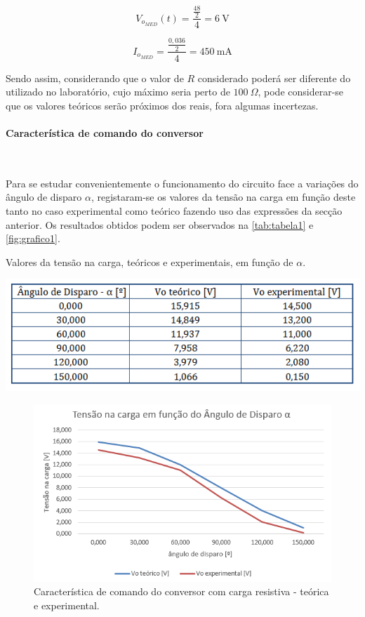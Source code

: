 \documentclass[a4paper,11pt]{article}
\numberwithin{equation}{section}
\begin{document}
\[V_{o_{MED}} (t) = \frac{\frac{48}{2}}{4} = 6~\text{V}\]

\[I_{o_{MED}}= \frac{\frac{0,036}{2}}{4} = 450~\text{mA}\]

\vspace{3mm}

Sendo assim, considerando que o valor de $R$ considerado poderá ser diferente do utilizado no laboratório, cujo máximo seria perto de $100~\Omega$, pode considerar-se que os valores teóricos serão próximos dos reais, fora algumas incertezas.

\paragraph{Característica de comando do conversor}\mbox{}\

Para se estudar convenientemente o funcionamento do circuito face a variações do ângulo de disparo $\alpha$, registaram-se os valores da tensão na carga em função deste tanto no caso experimental como teórico fazendo uso das expressões da secção anterior. Os resultados obtidos podem ser observados na \autoref{tab:tabela1} e \autoref{fig:grafico1}. 

\begin{table}[!htb]
	\centering
	\caption{Valores da tensão na carga, teóricos e experimentais, em função de $\alpha$.}
	\vspace{-3mm}
	\includegraphics[width=0.8\linewidth]{teoricas/tabela1}
	\label{tab:tabela1}
\end{table}

\begin{figure}[H]
	\centering
	\includegraphics[keepaspectratio=true, scale=0.8]{teoricas/grafico1}
	\vspace{-3mm}
	\caption{Característica de comando do conversor com carga resistiva - teórica e experimental.}
	\label{fig:grafico1}
	\vspace{-0.8em}
\end{figure}
\end{document}
